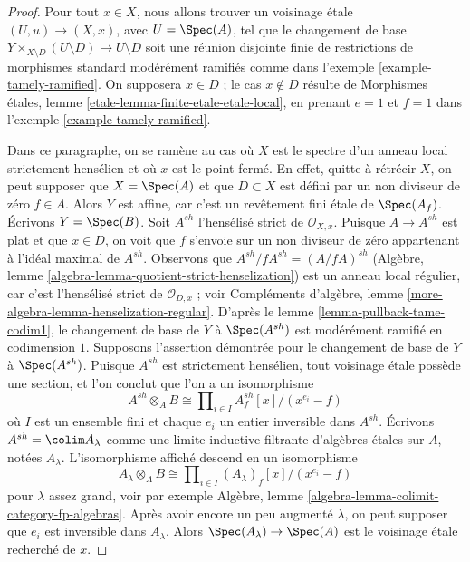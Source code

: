 \begin{proof}
Pour tout $x \in X$, nous allons trouver un voisinage \'etale
$(U, u) \to (X, x)$, avec $U = \Spec(A)$, tel que le changement de base
$Y \times_{X \setminus D} (U \setminus D) \to U \setminus D$ soit une réunion disjointe finie de restrictions de morphismes standard
modérément ramifiés comme dans l'exemple \ref{example-tamely-ramified}.
On supposera $x \in D$ ; le cas $x \not \in D$ résulte de
Morphismes \'etales, lemme \ref{etale-lemma-finite-etale-etale-local},
en prenant $e = 1$ et $f = 1$ dans l'exemple \ref{example-tamely-ramified}.

\medskip\noindent
Dans ce paragraphe, on se ramène au cas où $X$ est le spectre d'un
anneau local strictement hensélien et où $x$ est le point fermé. En effet, quitte à rétrécir
$X$, on peut supposer que $X = \Spec(A)$ et que $D \subset X$ est défini par un
non diviseur de zéro $f \in A$. Alors $Y$ est affine, car c'est un revêtement fini
\'etale de $\Spec(A_f)$. Écrivons $Y = \Spec(B)$.
Soit $A^{sh}$ l'hensélisé strict de $\mathcal{O}_{X, x}$.
Puisque $A \to A^{sh}$ est plat et que $x \in D$, on voit que $f$ s'envoie
sur un non diviseur de zéro appartenant à l'idéal maximal de $A^{sh}$.
Observons que $A^{sh}/fA^{sh} = (A/fA)^{sh}$
(Algèbre, lemme \ref{algebra-lemma-quotient-strict-henselization})
est un anneau local régulier, car c'est l'hensélisé strict de $\mathcal{O}_{D, x}$ ;
voir Compléments d'algèbre, lemme \ref{more-algebra-lemma-henselization-regular}.
D'après le lemme \ref{lemma-pullback-tame-codim1},
le changement de base de $Y$ à $\Spec(A^{sh})$ est modérément ramifié en
codimension $1$. Supposons l'assertion démontrée pour le changement de base
de $Y$ à $\Spec(A^{sh})$. Puisque $A^{sh}$ est strictement hensélien, tout
voisinage \'etale possède une section, et l'on conclut que l'on a un isomorphisme
$$
A^{sh} \otimes_A B \cong
\prod\nolimits_{i \in I} A^{sh}_f[x]/(x^{e_i} - f)
$$
où $I$ est un ensemble fini et chaque $e_i$ un entier inversible dans $A^{sh}$.
Écrivons $A^{sh} = \colim A_\lambda$ comme une limite inductive filtrante d'algèbres \'etales
sur $A$, notées $A_\lambda$. L'isomorphisme affiché
descend en un isomorphisme
$$
A_\lambda \otimes_A B \cong \prod\nolimits_{i \in I}
(A_\lambda)_f[x]/(x^{e_i} - f)
$$
pour $\lambda$ assez grand, voir par exemple
Algèbre, lemme \ref{algebra-lemma-colimit-category-fp-algebras}.
Après avoir encore un peu augmenté $\lambda$,
on peut supposer que $e_i$ est inversible dans $A_\lambda$. Alors
$\Spec(A_\lambda) \to \Spec(A)$ est le voisinage \'etale recherché
de $x$.


\end{proof}
